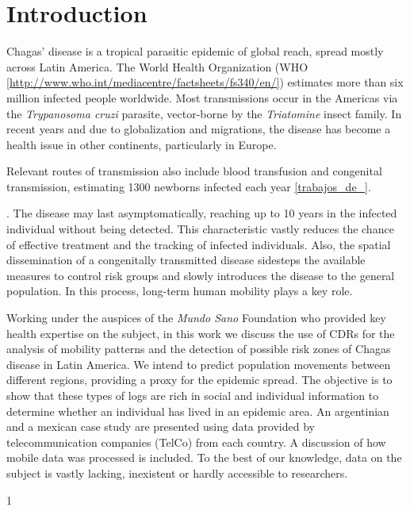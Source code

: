\section{Introduction}

Chagas' disease is a tropical parasitic epidemic of global reach, spread mostly across Latin America. The World Health Organization (WHO \ref{http://www.who.int/mediacentre/factsheets/fs340/en/}) estimates more than six million infected people worldwide. Most transmissions occur in the Americas via the \textit{Trypanosoma cruzi} parasite, vector-borne by the \textit{Triatomine} insect family. In recent years and due to globalization and migrations, the disease has become a health issue in other continents, particularly in Europe. 

Relevant routes of transmission also include blood transfusion and congenital transmission, estimating 1300 newborns infected each year \ref{trabajos_de_}.\begin{comment}  en el drive estan las ppt del min salud \end{comment}. The disease may last asymptomatically, reaching up to 10 years in the infected individual without being detected. This characteristic vastly reduces the chance of effective treatment and the tracking of infected individuals. Also, the spatial dissemination of a congenitally transmitted disease sidesteps the available measures to control risk groups and slowly introduces the disease to the general population. In this process, long-term human mobility plays a key role.

Working under the auspices of the \textit{Mundo Sano} Foundation who provided key health expertise on the subject, in this work we discuss the use of CDRs for the analysis of mobility patterns and the detection of possible risk zones of Chagas disease in Latin America. We intend to predict population movements between different regions, providing a proxy for the epidemic spread. The objective is to show that these types of logs are rich in social and individual information to determine whether an individual has lived in an epidemic area. An argentinian and a mexican case study are presented using data provided by telecommunication companies (TelCo) from each country. A discussion of how mobile data was processed is included. To the best of our knowledge, data on the subject is vastly lacking, inexistent or hardly accessible to researchers. 


1